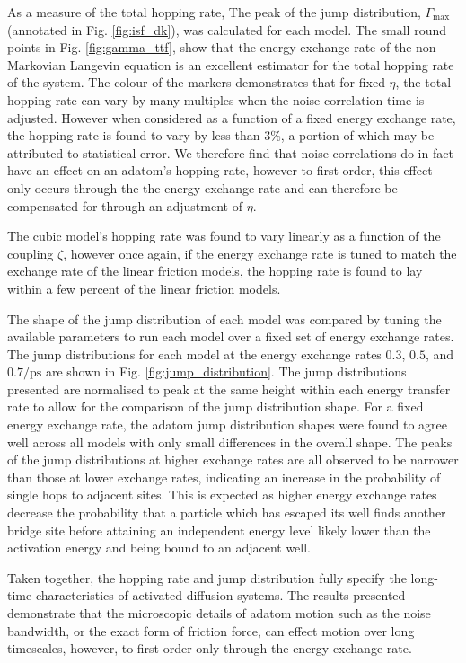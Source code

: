 \documentclass[7pt]{article}
\newcommand{\ips}{\si{\per\pico\second}}
\begin{document}
As a measure of the total hopping rate, The peak of the jump distribution, $\Gamma_{\text{max}}$ (annotated in Fig. \ref{fig:isf_dk}), was calculated for each model. The small round points in Fig. \ref{fig:gamma_ttf}, show that the energy exchange rate of the non-Markovian Langevin equation is an excellent estimator for the total hopping rate of the system. The colour of the markers demonstrates that for fixed $\eta$, the total hopping rate can vary by many multiples when the noise correlation time is adjusted. However when considered as a function of a fixed energy exchange rate, the hopping rate is found to vary by less than $3$\%, a portion of which may be attributed to statistical error. We therefore find that noise correlations do in fact have an effect on an adatom's hopping rate, however to first order, this effect only occurs through the the energy exchange rate and can therefore be compensated for through an adjustment of $\eta$.

The cubic model's hopping rate was found to vary linearly as a function of the coupling $\zeta$, however once again, if the energy exchange rate is tuned to match the exchange rate of the linear friction models, the hopping rate is found to lay within a few percent of the linear friction models.

The shape of the jump distribution of each model was compared by tuning the available parameters to run each model over a fixed set of energy exchange rates. The jump distributions for each model at the energy exchange rates $0.3$, $0.5$, and $0.7\ips$ are shown in Fig. \ref{fig:jump_distribution}. The jump distributions presented are normalised to peak at the same height within each energy transfer rate to allow for the comparison of the jump distribution shape. For a fixed energy exchange rate, the adatom jump distribution shapes were found to agree well across all models with only small differences in the overall shape. The peaks of the jump distributions at higher exchange rates are all observed to be narrower than those at lower exchange rates, indicating an increase in the probability of single hops to adjacent sites\cite{Diamant}. This is expected as higher energy exchange rates decrease the probability that a particle which has escaped its well finds another bridge site before attaining an independent energy level likely lower than the activation energy and being bound to an adjacent well.

Taken together, the hopping rate and jump distribution fully specify the long-time characteristics of activated diffusion systems. The results presented demonstrate that the microscopic details of adatom motion such as the noise bandwidth, or the exact form of friction force, can effect motion over long timescales, however, to first order only through the energy exchange rate. 
\end{document}

